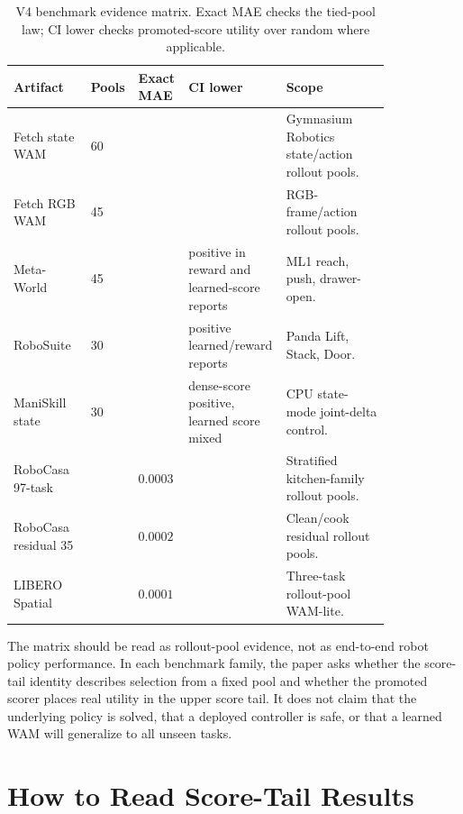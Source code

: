 \begin{table}[t]
\centering
\scriptsize
\begin{tabular}{p{0.20\linewidth}p{0.10\linewidth}p{0.13\linewidth}p{0.13\linewidth}p{0.27\linewidth}}
\toprule
Artifact & Pools & Exact MAE & CI lower & Scope \\
\midrule
Fetch state WAM & 60 & \VFourWAMFetchExactMAE{} & \VFourWAMFetchCILo{} &
Gymnasium Robotics state/action rollout pools. \\
Fetch RGB WAM & 45 & \VFourWAMFetchRGBExactMAE{} & \VFourWAMFetchRGBCILo{} &
RGB-frame/action rollout pools. \\
Meta-World & 45 & \VFourWAMMetaWorldExactMAE{} & positive in reward and
learned-score reports & ML1 reach, push, drawer-open. \\
RoboSuite & 30 & \VFourWAMRoboSuiteExactMAE{} & positive learned/reward
reports & Panda Lift, Stack, Door. \\
ManiSkill state & 30 & \VFourWAMManiSkillExactMAE{} & dense-score positive,
learned score mixed & CPU state-mode joint-delta control. \\
RoboCasa 97-task & \VFourWAMRoboCasaPools{} & $0.0003$ &
\VFourWAMRoboCasaCILo{} & Stratified kitchen-family rollout pools. \\
RoboCasa residual 35 & \VFourWAMRoboCasaResidualPools{} & $0.0002$ &
\VFourWAMRoboCasaResidualCILo{} & Clean/cook residual rollout pools. \\
LIBERO Spatial & \VFourWAMLiberoPools{} & $0.0001$ & \VFourWAMLiberoCILo{} &
Three-task rollout-pool WAM-lite. \\
\bottomrule
\end{tabular}
\caption{V4 benchmark evidence matrix. Exact MAE checks the tied-pool law;
CI lower checks promoted-score utility over random where applicable.}
\label{tab:benchmark-matrix}
\end{table}

The matrix should be read as rollout-pool evidence, not as end-to-end robot
policy performance. In each benchmark family, the paper asks whether the
score-tail identity describes selection from a fixed pool and whether the
promoted scorer places real utility in the upper score tail. It does not claim
that the underlying policy is solved, that a deployed controller is safe, or
that a learned WAM will generalize to all unseen tasks.

\section{How to Read Score-Tail Results}
\label{app:reading-score-tail}

